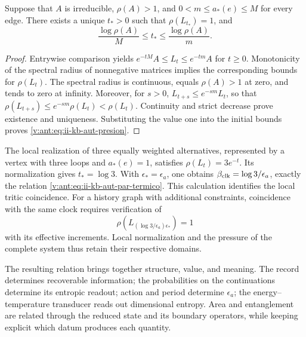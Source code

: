 \begin{proposition}
Suppose that \(A\) is irreducible, \(\rho(A)>1\), and
\(0<m\leq a_*(e)\leq M\) for every edge. There exists a unique
\(t_*>0\) such that \(\rho(L_{t_*})=1\), and
\begin{equation}
 \frac{\log\rho(A)}{M}\leq t_*\leq
 \frac{\log\rho(A)}{m}.
 \label{v:ant:eq:ii-kb-aut-presion}
\end{equation}
\end{proposition}
\begin{proof}
Entrywise comparison yields
\(e^{-tM}A\leq L_t\leq e^{-tm}A\) for \(t\geq0\).
Monotonicity of the spectral radius of nonnegative matrices implies
the corresponding bounds for \(\rho(L_t)\). The spectral radius
is continuous, equals \(\rho(A)>1\) at zero, and tends to zero at infinity.
Moreover, for \(s>0\),
\(L_{t+s}\leq e^{-sm}L_t\), so that
\(\rho(L_{t+s})\leq e^{-sm}\rho(L_t)<\rho(L_t)\).
Continuity and strict decrease prove existence and
uniqueness. Substituting the value one into the initial bounds proves
\eqref{v:ant:eq:ii-kb-aut-presion}.
\end{proof}

The local realization of three equally weighted alternatives, represented
by a vertex with three loops and \(a_*(e)=1\), satisfies
\(\rho(L_t)=3e^{-t}\). Its normalization gives \(t_*=\log3\).
With \(\epsilon_*=\epsilon_a\), one obtains
\(\beta_{\rm clk}=\log3/\epsilon_a\), exactly the relation
\eqref{v:ant:eq:ii-kb-aut-par-termico}. This calculation identifies the
local tritic coincidence. For a history graph with additional constraints,
coincidence with the same clock requires verification of
\[
 \rho\!\left(L_{(\log3/\epsilon_a)\epsilon_*}\right)=1
\]
with its effective increments. Local normalization and the pressure
of the complete system thus retain their respective domains.

The resulting relation brings together structure, value, and meaning. The record
determines recoverable information; the probabilities on the
continuations determine its entropic readout; action and period
determine \(\epsilon_a\); the energy--temperature transducer
reads out dimensional entropy. Area and entanglement are
related through the reduced state and its boundary operators,
while keeping explicit which datum produces each quantity.

